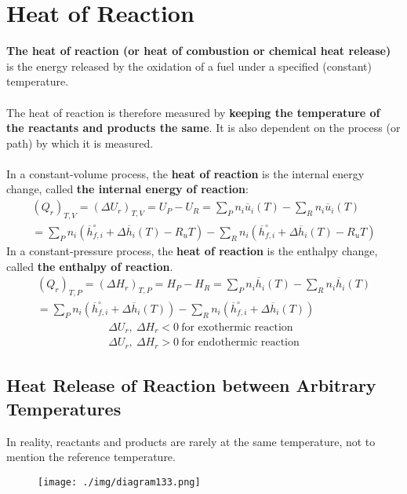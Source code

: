 \section{Heat of Reaction}
\textbf{The heat of reaction (or heat of combustion or chemical heat release)} is the energy released by the oxidation of a fuel under a specified (constant) temperature. \\\\
The heat of reaction is therefore measured by \textbf{keeping the temperature of the reactants and products the same}. It is also dependent on the process (or path) by which it is measured. \\\\
In a constant-volume process, the \textbf{heat of reaction} is the internal energy change, called \textbf{the internal energy of reaction}:
\begin{gather}
  (Q_r)_{T,V} = (\Delta U_r)_{T,V} = U_P - U_R = \sum_{P}n_i\overline{u}_i(T) - \sum_{R}n_i\overline{u}_i(T) \\[5pt]
  = \sum_{P}n_i\left(\overline{h}_{f,i}^\circ + \Delta\overline{h}_{i}(T) - R_uT\right) - \sum_{R}n_i\left(\overline{h}_{f,i}^\circ + \Delta\overline{h}_{i}(T) - R_uT\right)
\end{gather}
In a constant-pressure process, the \textbf{heat of reaction} is the enthalpy change, called \textbf{the enthalpy of reaction}.
\begin{gather}
  (Q_r)_{T,P} = (\Delta H_r)_{T,P} = H_P - H_R = \sum_{P}n_i\overline{h}_i(T) - \sum_{R}n_i\overline{h}_i(T) \\[5pt]
  = \sum_{P}n_i\left(\overline{h}_{f,i}^\circ + \Delta\overline{h}_i(T)\right) - \sum_{R}n_i\left(\overline{h}_{f,i}^\circ + \Delta\overline{h}_i(T)\right)
\end{gather}
\begin{gather*}
  \Delta U_r, \ \Delta H_r < 0 \ \text{for exothermic reaction} \\[5pt]
  \Delta U_r, \ \Delta H_r > 0 \ \text{for endothermic reaction}
\end{gather*}
\subsection{Heat Release of Reaction between Arbitrary Temperatures}
In reality, reactants and products are rarely at the same temperature, not to mention the reference temperature.
\begin{figure}[H]
  \centering
  \texttt{[image: ./img/diagram133.png]}
  \caption{}
\end{figure}
